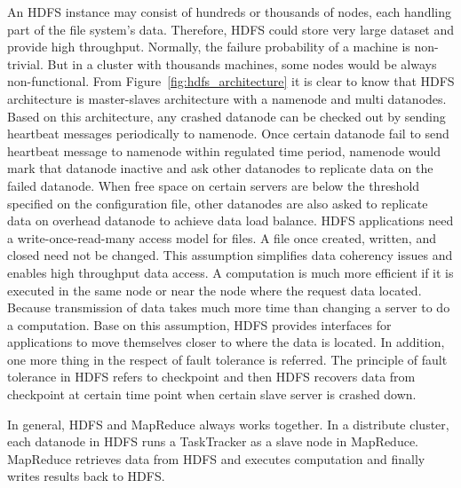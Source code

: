 An HDFS instance may consist of hundreds or thousands of nodes, each handling part of the file system's data. Therefore, HDFS could store very large dataset and provide high throughput. Normally, the failure probability of a machine is non-trivial. But in a cluster with thousands machines, some nodes would be always non-functional. From Figure~\ref{fig:hdfs_architecture} it is clear to know that HDFS architecture is master-slaves architecture with a namenode and multi datanodes. Based on this architecture, any crashed datanode can be checked out by sending heartbeat messages periodically to namenode. Once certain datanode fail to send heartbeat message to namenode within regulated time period, namenode would mark that datanode inactive and ask other datanodes to replicate data on the failed datanode. When free space on certain servers are below the threshold specified on the configuration file, other datanodes are also asked to replicate data on overhead datanode to achieve data load balance. HDFS applications need a write-once-read-many access model for files. A file once created, written, and closed need not be changed. This assumption simplifies data coherency issues and enables high throughput data access.\cite{HDFS} A computation is much more efficient if it is executed in the same node or near the node where the request data located. Because transmission of data takes much more time than changing a server to do a computation. Base on this assumption, HDFS provides interfaces for applications to move themselves closer to where the data is located. In addition, one more thing in the respect of fault tolerance is referred. The principle of fault tolerance in HDFS refers to checkpoint and then HDFS recovers data from checkpoint at certain time point when certain slave server is crashed down.

In general, HDFS and MapReduce always works together. In a distribute cluster, each datanode in HDFS runs  a TaskTracker as a slave node in MapReduce. MapReduce retrieves data from HDFS and executes computation and finally writes results back to HDFS.

